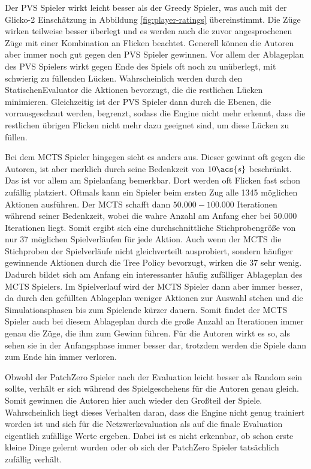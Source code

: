 Der \ac{PVS} Spieler wirkt leicht besser als der Greedy Spieler, was auch mit der Glicko-2 Einschätzung in Abbildung \ref{fig:player-ratings} übereinstimmt. Die Züge wirken teilweise besser überlegt und es werden auch die zuvor angesprochenen Züge mit einer Kombination an Flicken beachtet. Generell können die Autoren aber immer noch gut gegen den \ac{PVS} Spieler gewinnen. Vor allem der Ablageplan des \ac{PVS} Spielers wirkt gegen Ende des Spiels oft noch zu unüberlegt, mit schwierig zu füllenden Lücken. Wahrscheinlich werden durch den StatischenEvaluator die Aktionen bevorzugt, die die restlichen Lücken minimieren. Gleichzeitig ist der \ac{PVS} Spieler dann durch die Ebenen, die vorrausgeschaut werden, begrenzt, sodass die Engine nicht mehr erkennt, dass die restlichen übrigen Flicken nicht mehr dazu geeignet sind, um diese Lücken zu füllen.

Bei dem \ac{MCTS} Spieler hingegen sieht es anders aus. Dieser gewinnt oft gegen die Autoren, ist aber merklich durch seine Bedenkzeit von $10\acs{s}$ beschränkt. Das ist vor allem am Spielanfang bemerkbar. Dort werden oft Flicken fast schon zufällig platziert. Oftmals kann ein Spieler beim ersten Zug alle 1345 möglichen Aktionen ausführen. Der \ac{MCTS} schafft dann $50{.}000-100{.}000$ Iterationen während seiner Bedenkzeit, wobei die wahre Anzahl am Anfang eher bei $50{.}000$ Iterationen liegt. Somit ergibt sich eine durchschnittliche Stichprobengröße von nur 37 möglichen Spielverläufen für jede Aktion. Auch wenn der \ac{MCTS} die Stichproben der Spielverläufe nicht gleichverteilt ausprobiert, sondern häufiger gewinnende Aktionen durch die Tree Policy bevorzugt, wirken die $37$ sehr wenig. Dadurch bildet sich am Anfang ein interessanter häufig zufälliger Ablageplan des \ac{MCTS} Spielers. Im Spielverlauf wird der \ac{MCTS} Spieler dann aber immer besser, da durch den gefüllten Ablageplan weniger Aktionen zur Auswahl stehen und die Simulationsphasen bis zum Spielende kürzer dauern. Somit findet der \ac{MCTS} Spieler auch bei diesem Ablageplan durch die große Anzahl an Iterationen immer genau die Züge, die ihm zum Gewinn führen. Für die Autoren wirkt es so, als sehen sie in der Anfangsphase immer besser dar, trotzdem werden die Spiele dann zum Ende hin immer verloren.

Obwohl der PatchZero Spieler nach der Evaluation leicht besser als Random sein sollte, verhält er sich während des Spielgeschehens für die Autoren genau gleich. Somit gewinnen die Autoren hier auch wieder den Großteil der Spiele. Wahrscheinlich liegt dieses Verhalten daran, dass die Engine nicht genug trainiert worden ist und sich für die Netzwerkevaluation als auf die finale Evaluation eigentlich zufällige Werte ergeben. Dabei ist es nicht erkennbar, ob schon erste kleine Dinge gelernt wurden oder ob sich der PatchZero Spieler tatsächlich zufällig verhält.